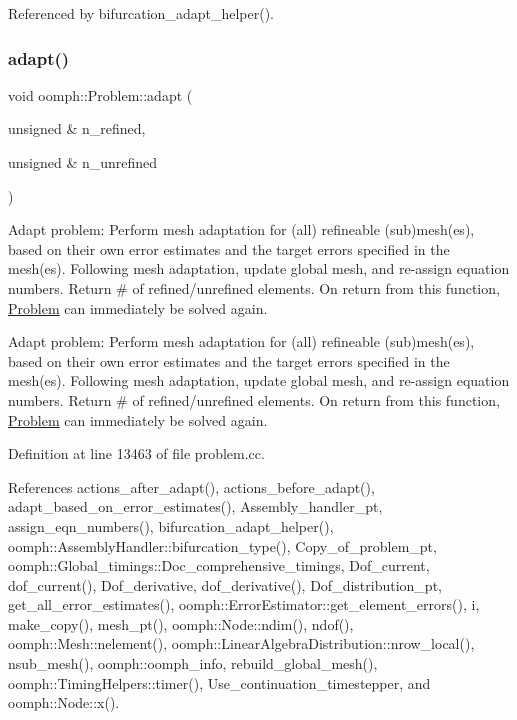 Referenced by bifurcation\+\_\+adapt\+\_\+helper().

\mbox{\label{classoomph_1_1Problem_afc4492ec2686c70467cb0cdb4638a45f}} 
\subsubsection{\texorpdfstring{adapt()}{adapt()}\hspace{0.1cm}{\footnotesize\ttfamily [1/2]}}
{\footnotesize\ttfamily void oomph\+::\+Problem\+::adapt (\begin{DoxyParamCaption}\item[{unsigned \&}]{n\+\_\+refined,  }\item[{unsigned \&}]{n\+\_\+unrefined }\end{DoxyParamCaption})}



Adapt problem\+: Perform mesh adaptation for (all) refineable (sub)mesh(es), based on their own error estimates and the target errors specified in the mesh(es). Following mesh adaptation, update global mesh, and re-\/assign equation numbers. Return \# of refined/unrefined elements. On return from this function, \hyperlink{classoomph_1_1Problem}{Problem} can immediately be solved again. 

Adapt problem\+: Perform mesh adaptation for (all) refineable (sub)mesh(es), based on their own error estimates and the target errors specified in the mesh(es). Following mesh adaptation, update global mesh, and re-\/assign equation numbers. Return \# of refined/unrefined elements. On return from this function, \hyperlink{classoomph_1_1Problem}{Problem} can immediately be solved again. 

Definition at line 13463 of file problem.\+cc.



References actions\+\_\+after\+\_\+adapt(), actions\+\_\+before\+\_\+adapt(), adapt\+\_\+based\+\_\+on\+\_\+error\+\_\+estimates(), Assembly\+\_\+handler\+\_\+pt, assign\+\_\+eqn\+\_\+numbers(), bifurcation\+\_\+adapt\+\_\+helper(), oomph\+::\+Assembly\+Handler\+::bifurcation\+\_\+type(), Copy\+\_\+of\+\_\+problem\+\_\+pt, oomph\+::\+Global\+\_\+timings\+::\+Doc\+\_\+comprehensive\+\_\+timings, Dof\+\_\+current, dof\+\_\+current(), Dof\+\_\+derivative, dof\+\_\+derivative(), Dof\+\_\+distribution\+\_\+pt, get\+\_\+all\+\_\+error\+\_\+estimates(), oomph\+::\+Error\+Estimator\+::get\+\_\+element\+\_\+errors(), i, make\+\_\+copy(), mesh\+\_\+pt(), oomph\+::\+Node\+::ndim(), ndof(), oomph\+::\+Mesh\+::nelement(), oomph\+::\+Linear\+Algebra\+Distribution\+::nrow\+\_\+local(), nsub\+\_\+mesh(), oomph\+::oomph\+\_\+info, rebuild\+\_\+global\+\_\+mesh(), oomph\+::\+Timing\+Helpers\+::timer(), Use\+\_\+continuation\+\_\+timestepper, and oomph\+::\+Node\+::x().

